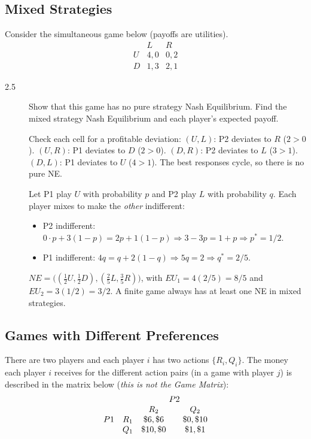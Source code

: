 \subsection{Mixed Strategies}

\noindent Consider the simultaneous game below (payoffs are utilities).
\[
\begin{array}{c|cc}
 & L & R\\ \hline
U & 4,0 & 0,2\\
D & 1,3 & 2,1
\end{array}
\]

\begin{description}
\item[2.5] Show that this game has no pure strategy Nash Equilibrium. Find the mixed strategy Nash Equilibrium and each player's expected payoff.
\begin{solution}
Check each cell for a profitable deviation: $(U,L)$: P2 deviates to $R$ ($2>0$). $(U,R)$: P1 deviates to $D$ ($2>0$). $(D,R)$: P2 deviates to $L$ ($3>1$). $(D,L)$: P1 deviates to $U$ ($4>1$). The best responses cycle, so there is no pure NE.

Let P1 play $U$ with probability $p$ and P2 play $L$ with probability $q$. Each player mixes to make the \emph{other} indifferent:
\begin{itemize}[nosep]
\item P2 indifferent: $0\cdot p+3(1-p)=2p+1(1-p)\Rightarrow3-3p=1+p\Rightarrow p^*=1/2$.
\item P1 indifferent: $4q=q+2(1-q)\Rightarrow5q=2\Rightarrow q^*=2/5$.
\end{itemize}
$NE=\big((\tfrac12U,\tfrac12D),(\tfrac25L,\tfrac35R)\big)$, with $EU_1=4(2/5)=8/5$ and $EU_2=3(1/2)=3/2$. A finite game always has at least one NE in mixed strategies.
\end{solution}
\end{description}

\subsection{Games with Different Preferences}

\noindent There are two players and each player $i$ has two actions $\{R_i,Q_i\}$. The money each player $i$ receives for the different action pairs (in a game with player $j$) is described in the matrix below (\emph{this is not the Game Matrix}):
\[
\begin{array}{ccc@{\qquad}c}
 & & \multicolumn{2}{c}{P2}\\
 & & R_2 & Q_2\\
P1 & R_1 & \$6,\$6 & \$0,\$10\\
 & Q_1 & \$10,\$0 & \$1,\$1
\end{array}
\]


